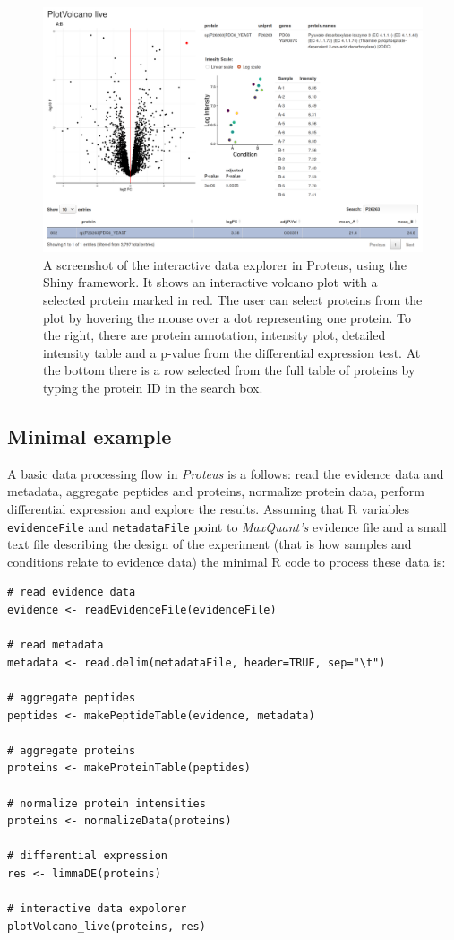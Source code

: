 \documentclass[]{article}
\begin{document}
\begin{figure}[H]

{\centering \includegraphics{../volcano_live_screenshot} 

}

\caption{\label{fig:shiny}A screenshot of the interactive data explorer in Proteus, using the Shiny framework. It shows an interactive volcano plot with a selected protein marked in red. The user can select proteins from the plot by hovering the mouse over a dot representing one protein. To the right, there are protein annotation, intensity plot, detailed intensity table and a p-value from the differential expression test. At the bottom there is a row selected from the full table of proteins by typing the protein ID in the search box.}\label{fig:fig_shiny}
\end{figure}

\subsection{Minimal example}\label{minimal-example}

A basic data processing flow in \emph{Proteus} is a follows: read the
evidence data and metadata, aggregate peptides and proteins, normalize
protein data, perform differential expression and explore the results.
Assuming that R variables \texttt{evidenceFile} and
\texttt{metadataFile} point to \emph{MaxQuant's} evidence file and a
small text file describing the design of the experiment (that is how
samples and conditions relate to evidence data) the minimal R code to
process these data is:

\begin{verbatim}
# read evidence data
evidence <- readEvidenceFile(evidenceFile)

# read metadata
metadata <- read.delim(metadataFile, header=TRUE, sep="\t")

# aggregate peptides
peptides <- makePeptideTable(evidence, metadata)

# aggregate proteins
proteins <- makeProteinTable(peptides)

# normalize protein intensities
proteins <- normalizeData(proteins)

# differential expression
res <- limmaDE(proteins)

# interactive data expolorer
plotVolcano_live(proteins, res)
\end{verbatim}
\end{document}
